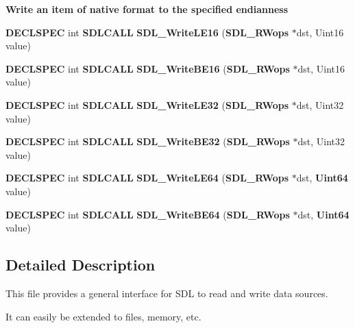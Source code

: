\begin{Indent}{\bf Write an item of native format to the specified endianness}\par
\begin{DoxyCompactItemize}
\item 
{\bf D\+E\+C\+L\+S\+P\+E\+C} int {\bf S\+D\+L\+C\+A\+L\+L} {\bfseries S\+D\+L\+\_\+\+Write\+L\+E16} ({\bf S\+D\+L\+\_\+\+R\+Wops} $\ast$dst, Uint16 value)\label{_s_d_l__rwops_8h_ae41bf3c051622db876fca539ce537b64}

\item 
{\bf D\+E\+C\+L\+S\+P\+E\+C} int {\bf S\+D\+L\+C\+A\+L\+L} {\bfseries S\+D\+L\+\_\+\+Write\+B\+E16} ({\bf S\+D\+L\+\_\+\+R\+Wops} $\ast$dst, Uint16 value)\label{_s_d_l__rwops_8h_afa7bd46242e199ee160f0fb6b1fa1399}

\item 
{\bf D\+E\+C\+L\+S\+P\+E\+C} int {\bf S\+D\+L\+C\+A\+L\+L} {\bfseries S\+D\+L\+\_\+\+Write\+L\+E32} ({\bf S\+D\+L\+\_\+\+R\+Wops} $\ast$dst, Uint32 value)\label{_s_d_l__rwops_8h_a741d0075b11254ae1495c6c3a97b6554}

\item 
{\bf D\+E\+C\+L\+S\+P\+E\+C} int {\bf S\+D\+L\+C\+A\+L\+L} {\bfseries S\+D\+L\+\_\+\+Write\+B\+E32} ({\bf S\+D\+L\+\_\+\+R\+Wops} $\ast$dst, Uint32 value)\label{_s_d_l__rwops_8h_a0e351f1b6868c34e14303830ae2c4820}

\item 
{\bf D\+E\+C\+L\+S\+P\+E\+C} int {\bf S\+D\+L\+C\+A\+L\+L} {\bfseries S\+D\+L\+\_\+\+Write\+L\+E64} ({\bf S\+D\+L\+\_\+\+R\+Wops} $\ast$dst, {\bf Uint64} value)\label{_s_d_l__rwops_8h_a593365137c6e8e9b2e67261da96647cd}

\item 
{\bf D\+E\+C\+L\+S\+P\+E\+C} int {\bf S\+D\+L\+C\+A\+L\+L} {\bfseries S\+D\+L\+\_\+\+Write\+B\+E64} ({\bf S\+D\+L\+\_\+\+R\+Wops} $\ast$dst, {\bf Uint64} value)\label{_s_d_l__rwops_8h_ac0b7a70e6b4ceaba9017e24c3a3f31c9}

\end{DoxyCompactItemize}
\end{Indent}


\subsection{Detailed Description}
This file provides a general interface for S\+D\+L to read and write data sources. 

It can easily be extended to files, memory, etc. 